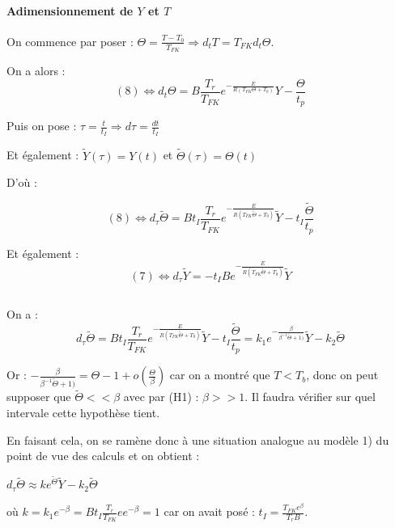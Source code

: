 \documentclass[10pt,a4paper,twocolumn]{report}
\begin{document}
	\paragraph{Adimensionnement de $Y$ et $T$}
	
	On commence par poser : $\Theta = \frac{T-T_0}{T_{FK}} \Rightarrow d_t T = T_{FK} d_t\Theta$.
	
	On a alors : $$(8) \Leftrightarrow d_t\Theta = B\frac{T_r}{T_{FK}}e^{-\frac{E}{R(T_{FK}\Theta+T_0)}}Y - \frac{\Theta}{t_p} $$
	
	Puis on pose : $ \tau = \frac{t}{t_I} \Rightarrow d\tau = \frac{dt}{t_I}$
	
	Et également : $ \tilde{Y}(\tau) = Y(t)$ et $ \tilde{\Theta}(\tau) = \Theta(t)$
	
	D'où : 
	
	$$(8) \Leftrightarrow  d_\tau\tilde{\Theta} = Bt_I\frac{T_r}{T_{FK}}e^{-\frac{E}{R(T_{FK}\tilde{\Theta}+T_0)}}\tilde{Y} - t_I \frac{\tilde{\Theta}}{t_p} $$
	
	Et également : $$(7) \Leftrightarrow d_\tau\tilde{Y} = -t_IBe^{-\frac{E}{R(T_{FK}\tilde{\Theta}+T_0)}}\tilde{Y}$$
	
	\subsection{} %
		
	\subsubsection{}%
	On a : 
	$$ d_\tau\tilde{\Theta} = Bt_I\frac{T_r}{T_{FK}}e^{-\frac{E}{R(T_{FK}\tilde{\Theta}+T_0)}}\tilde{Y} - t_I \frac{\tilde{\Theta}}{t_p} = k_1 e^{-\frac{\beta}{\beta^{-1}\tilde{\Theta}+1)}}\tilde{Y} - k_2 \tilde{\Theta}$$
	
	Or :
	$ -\frac{\beta}{\beta^{-1}\tilde{\Theta}+1)} = \Theta - 1 + o(\frac{\Theta}{\beta})$ car on a montré que $T<T_b$, donc on peut supposer que $\tilde{\Theta} << \beta$ avec par (H1) : $\beta >> 1$. Il faudra vérifier sur quel intervale cette hypothèse tient.
	
	En faisant cela, on se ramène donc à une situation analogue au modèle 1) du point de vue des calculs et on obtient :
	
	$ d_\tau\tilde{\Theta} \approx k e^{\tilde{\Theta}}\tilde{Y} - k_2 \tilde{\Theta} $ 
	
	où $ k = k_1 e^{-\beta} = Bt_I \frac{T_r}{T_{FK}} e e^{-\beta} = 1$ car on avait posé : $t_I = \frac{T_{FK}e^{\beta}}{T_rB}$.
	
\end{document}
